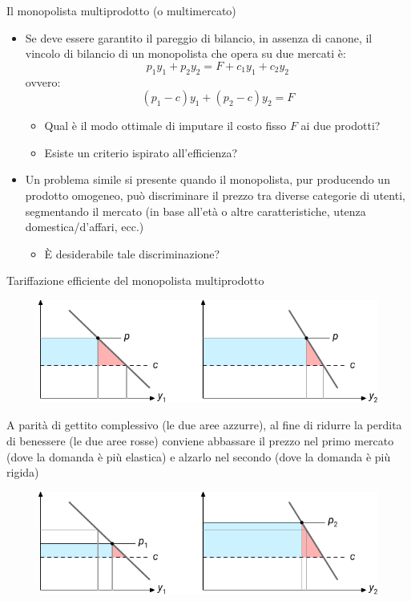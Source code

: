 \documentclass[aspectratio=64,12pt]{beamer}
\begin{document}
\begin{frame}{Il monopolista multiprodotto (o multimercato)}
\begin{itemize}
\item Se deve essere garantito il pareggio di bilancio, in assenza di canone,
  il vincolo di bilancio di un monopolista che opera su due mercati è:
\begin{equation*}
 p_1y_1+p_2y_2=F+c_1y_1+c_2y_2
\end{equation*}
ovvero:
\begin{equation*}
 (p_1-c)y_1+(p_2-c)y_2=F
\end{equation*}
\begin{itemize}
\item Qual è il modo ottimale di imputare il costo fisso $F$ ai due prodotti?
\item Esiste un criterio ispirato all'efficienza?
\end{itemize}
\item Un problema simile si presente quando il monopolista, pur producendo un
prodotto omogeneo, può \alert{discriminare} il prezzo tra diverse categorie di
utenti, segmentando il mercato (in base all'età o altre caratteristiche,
utenza domestica/d'affari, ecc.)
\begin{itemize}
\item È desiderabile tale discriminazione?
\end{itemize}
\end{itemize}
\end{frame}

\begin{frame}{Tariffazione efficiente del monopolista multiprodotto}
\begin{figure}[htbp]
\centering
\includegraphics[width=.7\textwidth]{./figure/ramsey-1-color.pdf}
\end{figure}

A parità di gettito complessivo (le due aree azzurre), al fine di ridurre la perdita
di benessere (le due aree rosse) conviene abbassare il prezzo nel primo mercato (dove
la domanda è più elastica) e alzarlo nel secondo (dove la domanda è più
rigida)

\begin{figure}[htbp]
\centering
\includegraphics[width=.7\textwidth]{./figure/ramsey-2-color.pdf}
\end{figure}
\end{frame}
\end{document}
